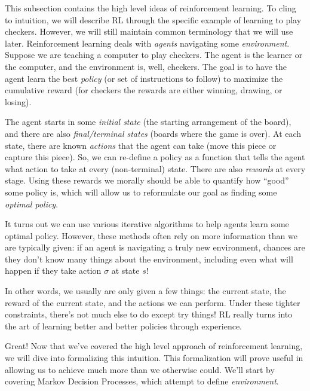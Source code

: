 \documentclass[12pt,oneside,oldfontcommands]{memoir}
\theoremstyle{definition}
\newcommand{\s}{\sigma}
\begin{document}
\begin{Subsection}
This subsection contains the high level ideas of reinforcement learning. To cling to intuition, we will describe RL through the specific example of learning to play checkers. However, we will still maintain common terminology that we will use later. 
\tcblower
Reinforcement learning deals with \textit{agents} navigating some \textit{environment}. Suppose we are teaching a computer to play checkers. The agent is the learner or the computer, and the environment is, well, checkers. The goal is to have the agent learn the best \textit{policy} (or set of instructions to follow) to maximize the cumulative reward (for checkers the rewards are either winning, drawing, or losing). 

The agent starts in some \textit{initial state} (the starting arrangement of the board), and there are also \textit{final/terminal states} (boards where the game is over). At each state, there are known \textit{actions} that the agent can take (move this piece or capture this piece). So, we can re-define a policy as a function that tells the agent what action to take at every (non-terminal) state. There are also \textit{rewards} at every stage. Using these rewards we morally should be able to quantify how ``good'' some policy is, which will allow us to reformulate our goal as finding some \textit{optimal policy}. 

It turns out we can use various iterative algorithms to help agents learn some optimal policy. However, these methods often rely on more information than we are typically given: if an agent is navigating a truly new environment, chances are they don't know many things about the environment, including even what will happen if they take action $\s$ at state $s$!

In other words, we usually are only given a few things: the current state, the reward of the current state, and the actions we can perform. Under these tighter constraints, there's not much else to do except try things! RL really turns into the art of learning better and better policies through experience.

Great! Now that we've covered the high level approach of reinforcement learning, we will dive into formalizing this intuition. This formalization will prove useful in allowing us to achieve much more than we otherwise could. We'll start by covering Markov Decision Processes, which attempt to define \textit{environment}. 
\end{Subsection}
\end{document}
